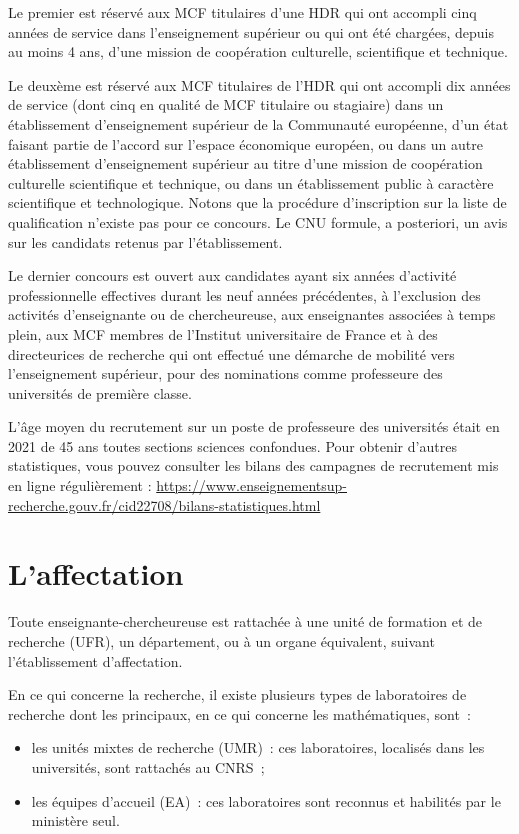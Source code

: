 Le premier est r\'eserv\'e
aux MCF titulaires d'une HDR qui ont accompli cinq ann\'ees de service dans l'enseignement sup\'erieur ou qui ont \'et\'e charg\'e\mp e\mp s, 
depuis au moins 4 ans, d'une mission de coop\'eration culturelle,
scientifique et technique.

Le deux\`eme est r\'eserv\'e aux MCF titulaires de l'HDR qui ont accompli dix ann\'ees de service
(dont cinq en qualit\'e de MCF titulaire ou stagiaire) dans un \'etablissement d'enseignement sup\'erieur
de la Communaut\'e europ\'eenne, d'un \'etat faisant partie de l'accord sur l'espace \'economique
europ\'een,
ou dans un autre \'etablissement d'enseignement sup\'erieur au titre d'une mission de coop\'eration culturelle scientifique et technique, 
ou dans un \'etablissement public \`a caract\`ere scientifique et technologique.
Notons que la proc\'edure d'inscription sur la liste de qualification n'existe pas pour ce concours.
Le CNU formule, a posteriori, un avis sur les candidats retenus par l'\'etablissement.

Le dernier concours est ouvert
aux candidat\mp e\mp s ayant six ann\'ees d'activit\'e professionnelle effectives
durant les neuf ann\'ees pr\'ec\'edentes,
\`a l'exclusion des activit\'es d'enseignant\mp e ou de chercheur\mp euse,
aux enseignant\mp e\mp s associ\'e\mp e\mp s \`a temps plein,
aux MCF membres de l'Institut universitaire de France
et \`a des directeur\mp ice\mp s de recherche qui ont effectu\'e une d\'emarche de mobilit\'e
vers l'enseignement sup\'erieur, pour des nominations comme professeur\mp e des universit\'es de premi\`ere classe.

L'\^age moyen du recrutement sur un poste de  professeur\mp e des
universit\'es \'etait en 2021 de 45 ans toutes sections sciences confondues. Pour obtenir d'autres statistiques, vous pouvez consulter les bilans des campagnes de recrutement mis en ligne r\'e\-gu\-li\`erement :
{\url{https://www.enseignementsup-recherche.gouv.fr/cid22708/bilans-statistiques.html}}

\section{L'affectation}

Tout\mp e enseignant\mp e-chercheur\mp euse est rattach\'e\mp e \`a une unit\'e de formation
et de recherche (UFR), un d\'epar\-te\-ment, ou \`a un organe
\'equivalent, suivant l'\'etablissement d'affectation.

En ce qui concerne la recherche, il existe plusieurs types de
laboratoires de recherche dont les principaux, en ce qui concerne
les math\'ematiques, sont~:
\begin{itemize}
	\item les unit\'es mixtes de recherche (UMR)~: ces laboratoires,
		localis\'es dans les universit\'es, sont rattach\'es au CNRS~;
	\item les \'equipes d'accueil (EA)~: ces laboratoires sont
		reconnus et habilit\'es par le minist\`ere seul.
\end{itemize}

